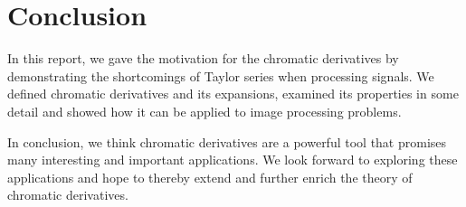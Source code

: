 \documentclass[11pt,oneside]{book}
\theoremstyle{plain}
\theoremstyle{definition}
\theoremstyle{remark}
\begin{document}
\chapter{Conclusion}

In this report, we gave the motivation for the chromatic derivatives
by demonstrating the shortcomings of Taylor series when processing signals.
We defined chromatic derivatives and its expansions, examined its 
properties in some detail and showed how it can be applied to image processing
problems.

In conclusion, we think chromatic derivatives are a powerful tool that promises 
many interesting and important applications. We look forward to exploring 
these applications and hope to thereby extend and further enrich the theory of
chromatic derivatives. 


\newpage







\printindex

\end{document}
